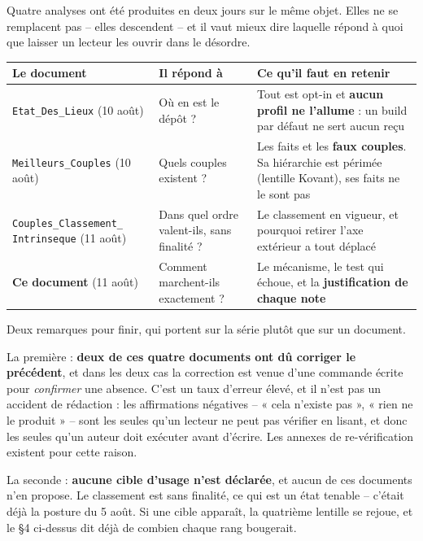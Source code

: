 \documentclass[10pt]{article}
\newcommand{\sz}[1]{{\small\color{grey}\textsf{#1}}}
\newcommand{\code}[1]{\texttt{\small #1}}
\begin{document}
Quatre analyses ont été produites en deux jours sur le même objet. Elles ne se remplacent pas -- elles
descendent -- et il vaut mieux dire laquelle répond à quoi que laisser un lecteur les ouvrir dans le
désordre.

\renewcommand{\arraystretch}{1.25}
\begin{center}\small
\begin{tabular}{@{}>{\raggedright\arraybackslash}p{5.0cm} >{\raggedright\arraybackslash}p{5.4cm} >{\raggedright\arraybackslash}p{5.6cm}@{}}
\toprule
\textbf{Le document} & \textbf{Il répond à} & \textbf{Ce qu'il faut en retenir} \\
\midrule
\code{Etat\_Des\_Lieux} \sz{(10 août)} &
  Où en est le dépôt ? &
  Tout est opt-in et \textbf{aucun profil ne l'allume} : un build par défaut ne sert aucun reçu \\
\code{Meilleurs\_Couples} \sz{(10 août)} &
  Quels couples existent ? &
  Les faits et les \textbf{faux couples}. Sa hiérarchie est périmée \sz{(lentille Kovant)}, ses faits
  ne le sont pas \\
\code{Couples\_Classement\_} \code{Intrinseque} \sz{(11 août)} &
  Dans quel ordre valent-ils, sans finalité ? &
  Le classement en vigueur, et pourquoi retirer l'axe extérieur a tout déplacé \\
\textbf{Ce document} \sz{(11 août)} &
  Comment marchent-ils exactement ? &
  Le mécanisme, le test qui échoue, et la \textbf{justification de chaque note} \\
\bottomrule
\end{tabular}
\end{center}

Deux remarques pour finir, qui portent sur la série plutôt que sur un document.

La première : \textbf{deux de ces quatre documents ont dû corriger le précédent}, et dans les deux cas
la correction est venue d'une commande écrite pour \emph{confirmer} une absence. C'est un taux d'erreur
élevé, et il n'est pas un accident de rédaction : les affirmations négatives -- « cela n'existe pas »,
« rien ne le produit » -- sont les seules qu'un lecteur ne peut pas vérifier en lisant, et donc les
seules qu'un auteur doit exécuter avant d'écrire. Les annexes de re-vérification existent pour cette
raison.

La seconde : \textbf{aucune cible d'usage n'est déclarée}, et aucun de ces documents n'en propose. Le
classement est sans finalité, ce qui est un état tenable -- c'était déjà la posture du 5 août. Si une
cible apparaît, la quatrième lentille se rejoue, et le §4 ci-dessus dit déjà de combien chaque rang
bougerait.
\end{document}
